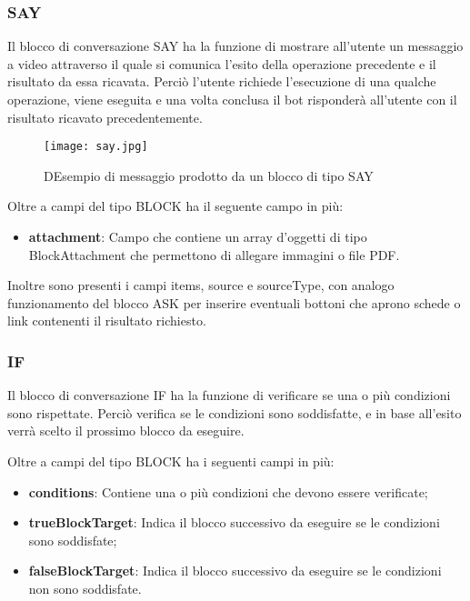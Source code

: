 \subsubsection{SAY}

Il blocco di conversazione SAY ha la funzione di mostrare all'utente un messaggio a video attraverso il quale si comunica l'esito della operazione precedente e il risultato da essa ricavata. Perciò l'utente richiede l'esecuzione di una qualche operazione, viene eseguita e una volta conclusa il bot risponderà all'utente con il risultato ricavato precedentemente.

\begin{figure}[htbp]
	\centering
	\texttt{[image: say.jpg]}
	\caption{DEsempio di messaggio prodotto da un blocco di tipo SAY}
\end{figure}
Oltre a campi del tipo BLOCK ha il seguente campo in più:

\begin{itemize}
	\item \textbf{attachment}: Campo che contiene un array d'oggetti di tipo BlockAttachment che permettono di allegare immagini o file PDF.
\end{itemize}

Inoltre sono presenti i campi items, source e sourceType, con analogo funzionamento del blocco ASK per inserire eventuali bottoni che aprono schede o link contenenti il risultato richiesto.

\subsubsection{IF}

Il blocco di conversazione IF ha la funzione di verificare se una o più condizioni sono rispettate. Perciò verifica se le condizioni sono soddisfatte, e in base all'esito verrà scelto il prossimo blocco da eseguire.

Oltre a campi del tipo BLOCK ha i seguenti campi in più:

\begin{itemize}
	\item \textbf{conditions}: Contiene una o più condizioni che devono essere verificate;
	\item \textbf{trueBlockTarget}: Indica il blocco successivo da eseguire se le condizioni sono soddisfate;
	\item \textbf{falseBlockTarget}: Indica il blocco successivo da eseguire se le condizioni non sono soddisfate.
\end{itemize}


